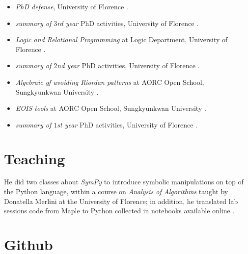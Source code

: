 \documentclass[a4paper]{tufte-handout}
\begin{document}
    \begin{itemize}
        \item \textit{PhD defense}, University of Florence .
        \item \textit{summary of $3$rd year} PhD activities, University of Florence .
        \item \textit{Logic and Relational Programming} at Logic Department, University of Florence .
        \item \textit{summary of $2$nd year} PhD activities, University of Florence .
        \item \textit{Algebraic gf avoiding Riordan patterns} at AORC Open School, Sungkyunkwan University .
        \item \textit{EOIS tools} at AORC Open School, Sungkyunkwan University .
        \item \textit{summary of $1$st year} PhD activities, University of Florence .
    \end{itemize}

    \section{Teaching}

    He did two classes about \emph{SymPy} to introduce symbolic manipulations
    on top of the Python language, within a course on \emph{Analysis of
    Algorithms} taught by Donatella Merlini at the University of Florence; in
    addition, he translated lab sessions code from Maple to Python collected in
    notebooks available online
    .

    \section{Github}
\end{document}
